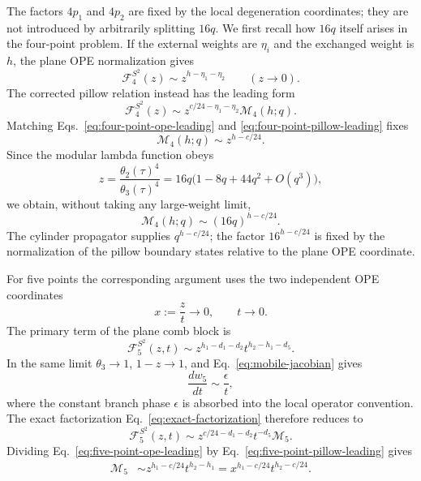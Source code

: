 \documentclass[11pt]{article}
\newcommand{\cF}{\mathcal F}
\newcommand{\cM}{\mathcal M}
\begin{document}
The factors $4p_1$ and $4p_2$ are fixed by the local degeneration
coordinates; they are not introduced by arbitrarily splitting $16q$.
We first recall how $16q$ itself arises in the four-point problem.  If the
external weights are $\eta_i$ and the exchanged weight is $h$, the plane
OPE normalization gives
\begin{equation}
 \cF^{S^2}_4(z)\sim z^{h-\eta_1-\eta_2}
 \qquad(z\to0).
 \label{eq:four-point-ope-leading}
\end{equation}
The corrected pillow relation instead has the leading form
\begin{equation}
 \cF^{S^2}_4(z)
 \sim z^{c/24-\eta_1-\eta_2}\cM_4(h;q).
 \label{eq:four-point-pillow-leading}
\end{equation}
Matching Eqs.~\eqref{eq:four-point-ope-leading} and
\eqref{eq:four-point-pillow-leading} fixes
\begin{equation}
 \cM_4(h;q)\sim z^{h-c/24}.
 \label{eq:four-point-matrix-leading-z}
\end{equation}
Since the modular lambda function obeys
\begin{equation}
 z=\frac{\theta_2(\tau)^4}{\theta_3(\tau)^4}
  =16q\bigl(1-8q+44q^2+O(q^3)\bigr),
 \label{eq:lambda-leading-sixteen}
\end{equation}
we obtain, without taking any large-weight limit,
\begin{equation}
 \boxed{\cM_4(h;q)\sim(16q)^{h-c/24}.}
 \label{eq:four-point-sixteen-q}
\end{equation}
The cylinder propagator supplies $q^{h-c/24}$; the factor
$16^{h-c/24}$ is fixed by the normalization of the pillow boundary states
relative to the plane OPE coordinate.

For five points the corresponding argument uses the two independent OPE
coordinates
\begin{equation}
 x:=\frac{z}{t}\longrightarrow0,\qquad t\longrightarrow0.
 \label{eq:double-cusp-variables}
\end{equation}
The primary term of the plane comb block is
\begin{equation}
 \cF^{S^2}_5(z,t)
 \sim z^{h_1-d_1-d_2}t^{h_2-h_1-d_5}.
 \label{eq:five-point-ope-leading}
\end{equation}
In the same limit $\theta_3\to1$, $1-z\to1$, and
Eq.~\eqref{eq:mobile-jacobian} gives
\begin{equation}
 \frac{dw_5}{dt}\sim\frac{\epsilon}{t},
 \label{eq:mobile-jacobian-cusp}
\end{equation}
where the constant branch phase $\epsilon$ is absorbed into the local
operator convention.  The exact factorization
Eq.~\eqref{eq:exact-factorization} therefore reduces to
\begin{equation}
 \cF^{S^2}_5(z,t)
 \sim z^{c/24-d_1-d_2}t^{-d_5}\cM_5.
 \label{eq:five-point-pillow-leading}
\end{equation}
Dividing Eq.~\eqref{eq:five-point-ope-leading} by
Eq.~\eqref{eq:five-point-pillow-leading} gives
\begin{align}
 \cM_5
 &\sim z^{h_1-c/24}t^{h_2-h_1}
  =x^{h_1-c/24}t^{h_2-c/24}.
 \label{eq:five-point-matrix-leading-plane}
\end{align}
\end{document}
